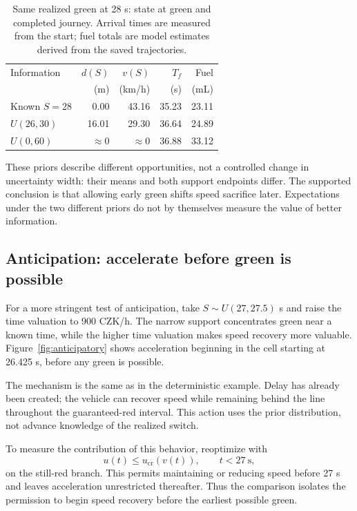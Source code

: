 \documentclass[journal,a4paper,twocolumn]{IEEEtran}
\newcommand{\cruise}{\mathrm{cr}}
\begin{document}
\begin{table}[!t]
\centering
\caption{Same realized green at 28 s: state at green and completed journey. Arrival times are measured from the start; fuel totals are model estimates derived from the saved trajectories.}
\label{tab:realized}
\begingroup\footnotesize\setlength{\tabcolsep}{4pt}
\begin{tabular}{@{}lrrrr@{}}
\toprule
Information & $d(S)$ & $v(S)$ & $T_f$ & Fuel\\
 & (m) & (km/h) & (s) & (mL)\\
\midrule
Known $S=28$ & 0.00 & 43.16 & 35.23 & 23.11\\
$U(26,30)$ & 16.01 & 29.30 & 36.64 & 24.89\\
$U(0,60)$ & $\approx0$ & $\approx0$ & 36.88 & 33.12\\
\bottomrule
\end{tabular}\endgroup
\end{table}

These priors describe different opportunities, not a controlled change in uncertainty width: their means and both support endpoints differ. The supported conclusion is that allowing early green shifts speed sacrifice later. Expectations under the two different priors do not by themselves measure the value of better information.

\subsection{Anticipation: accelerate before green is possible}\label{sec:anticipation}
For a more stringent test of anticipation, take $S\sim U(27,27.5)$ s and raise the time valuation to 900 CZK/h. The narrow support concentrates green near a known time, while the higher time valuation makes speed recovery more valuable. Figure~\ref{fig:anticipatory} shows acceleration beginning in the cell starting at 26.425 s, before any green is possible.

The mechanism is the same as in the deterministic example. Delay has already been created; the vehicle can recover speed while remaining behind the line throughout the guaranteed-red interval. This action uses the prior distribution, not advance knowledge of the realized switch.

To measure the contribution of this behavior, reoptimize with
\begin{equation}
 u(t)\le u_{\cruise}(v(t)),\qquad t<27\ \mathrm s,
 \label{eq:noinc}
\end{equation}
on the still-red branch. This permits maintaining or reducing speed before 27 s and leaves acceleration unrestricted thereafter. Thus the comparison isolates the permission to begin speed recovery before the earliest possible green.
\end{document}
